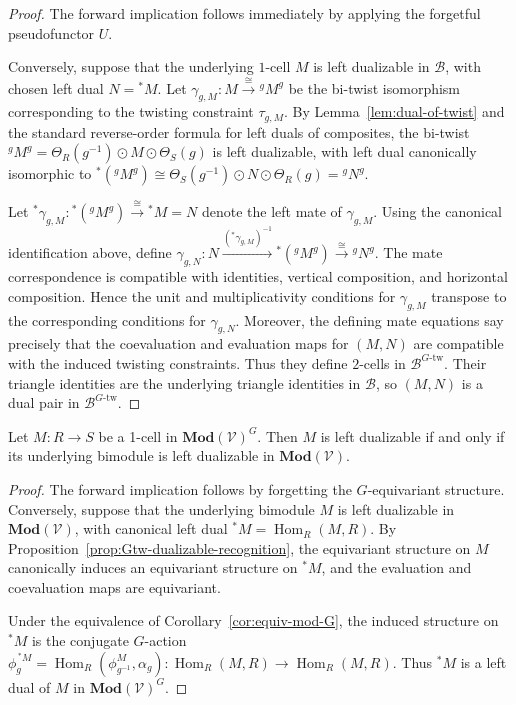 \documentclass[11pt,oneside]{amsart}
\DeclareMathOperator{\Hom}{Hom}
\numberwithin{equation}{section}
\numberwithin{figure}{section}
\theoremstyle{plain}
\theoremstyle{definition}
\theoremstyle{remark}
\begin{document}
\begin{proof}
The forward implication follows immediately by applying the forgetful pseudofunctor \(U\).

Conversely, suppose that the underlying \(1\)-cell \(M\) is left dualizable in \(\mathcal B\), with chosen left dual \(N={}^*M\). Let \(\gamma_{g,M}\colon M\xrightarrow{\cong}{}^gM^g\) be the bi-twist isomorphism corresponding to the twisting constraint \(\tau_{g,M}\). By Lemma~\ref{lem:dual-of-twist} and the standard reverse-order formula for left duals of composites, the bi-twist \({}^gM^g = \Theta_R(g^{-1})\odot M\odot\Theta_S(g)\) is left dualizable, with left dual canonically isomorphic to \({}^*({}^gM^g) \cong \Theta_S(g^{-1})\odot N\odot\Theta_R(g) = {}^gN^g\). 

Let \({}^*\gamma_{g,M}\colon {}^*({}^gM^g)\xrightarrow{\cong}{}^*M=N\) denote the left mate of \(\gamma_{g,M}\). Using the canonical identification above, define \(\gamma_{g,N}\colon N \xrightarrow{({}^*\gamma_{g,M})^{-1}} {}^*({}^gM^g) \xrightarrow{\cong} {}^gN^g\).
The mate correspondence is compatible with identities, vertical
composition, and horizontal composition. Hence the unit and
multiplicativity conditions for \(\gamma_{g,M}\) transpose to the
corresponding conditions for \(\gamma_{g,N}\). Moreover, the defining
mate equations say precisely that the coevaluation and evaluation
maps for \((M,N)\) are compatible with the induced twisting
constraints. Thus they define \(2\)-cells in
\(\mathcal B^{G\text{-tw}}\). Their triangle identities are the
underlying triangle identities in \(\mathcal B\), so
\((M,N)\) is a dual pair in \(\mathcal B^{G\text{-tw}}\).
\end{proof}

 

 

\begin{cor}\label{cor:algebraic_dualizable_recognition}
Let \(M\colon R\to S\) be a 1-cell in \(\mathbf{Mod}(\mathcal V)^G\). Then \(M\) is left dualizable if and only if its underlying bimodule is left dualizable in \(\mathbf{Mod}(\mathcal V)\). 
\end{cor}
\begin{proof}
The forward implication follows by forgetting the \(G\)-equivariant
structure. Conversely, suppose that the underlying bimodule \(M\) is
left dualizable in \(\mathbf{Mod}(\mathcal V)\), with canonical left
dual
\(
{}^*M=\Hom_R(M,R).
\)
By Proposition~\ref{prop:Gtw-dualizable-recognition}, the equivariant
structure on \(M\) canonically induces an equivariant structure on
\({}^*M\), and the evaluation and coevaluation maps are equivariant.

Under the equivalence of
Corollary~\ref{cor:equiv-mod-G}, the induced structure on \({}^*M\) is
the conjugate \(G\)-action
\(
\phi^{\,{}^*M}_g
=
\Hom_R(\phi^M_{g^{-1}},\alpha_g):
\Hom_R(M,R)\to\Hom_R(M,R).
\)
Thus \({}^*M\) is a left dual of \(M\) in
\(\mathbf{Mod}(\mathcal V)^G\).
\end{proof}
\end{document}
